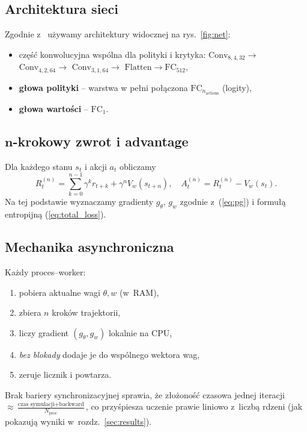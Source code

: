 \documentclass[12pt,a4paper]{article}
\begin{document}
\subsection{Architektura sieci}
\label{sec:arch}

Zgodnie z~\cite{Mnih2016A3C,Lapan2018} używamy
architektury widocznej na rys.~\ref{fig:net}:
\begin{itemize}
  \item część konwolucyjna wspólna dla polityki i krytyka:  
        \(\mathrm{Conv}_{8,4,32}\rightarrow\)
        \(\mathrm{Conv}_{4,2,64}\rightarrow\)
        \(\mathrm{Conv}_{3,1,64}\rightarrow\)
        \(\mathrm{Flatten}\rightarrow\mathrm{FC}_{512}\),
  \item \textbf{głowa polityki} – warstwa w pełni połączona
        \(\mathrm{FC}_{n_\text{actions}}\) (logity),
  \item \textbf{głowa wartości} – \(\mathrm{FC}_{1}\).
\end{itemize}

\subsection{$\boldsymbol{n}$-krokowy zwrot i advantage}

Dla każdego stanu $s_t$ i akcji $a_t$ obliczamy
\[
  R^{(n)}_t
    =\sum_{k=0}^{n-1}\gamma^{k}r_{t+k}
     +\gamma^{n}V_w(s_{t+n}),
  \quad
  A^{(n)}_t
    =R^{(n)}_t - V_w(s_t).
\]
Na tej podstawie wyznaczamy gradienty
$g_\theta$, $g_w$ zgodnie z~(\ref{eq:pg})
i formułą entropijną
(\ref{eq:total_loss}).

\subsection{Mechanika asynchroniczna}

Każdy proces–worker:
\begin{enumerate}
  \item pobiera aktualne wagi \(\theta, w\) (w~RAM),
  \item zbiera $n$ kroków trajektorii,
  \item liczy gradient \((g_\theta, g_w)\) lokalnie na CPU,
  \item \emph{bez blokady} dodaje je do wspólnego wektora wag,
  \item zeruje licznik i powtarza.
\end{enumerate}
Brak bariery synchronizacyjnej sprawia, że
złożoność czasowa jednej iteracji $\approx
\frac{\text{czas symulacji}+ \text{backward}}{N_\text{proc}}$,
co przyśpiesza uczenie prawie liniowo z~liczbą rdzeni
(jak pokazują wyniki w~rozdz.~\ref{sec:results}).
\end{document}
